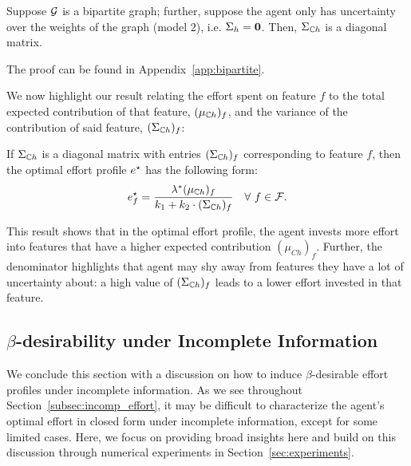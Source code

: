 \begin{prop}\label{prop:bipartite}
Suppose $\mathcal{G}$ is a bipartite graph; further, suppose the agent only has uncertainty over the weights of the graph (model $2$), i.e. $\Sigma_h = \bf{0}$. Then, $\Sigma_{\mathbb{C} h}$ is a diagonal matrix.
\end{prop}


The proof can be found in Appendix~\ref{app:bipartite}.


We now highlight our result relating the effort spent on feature $f$ to the total expected contribution of that feature, $(\mu_{\mathbb{C} h})_f$, and the variance of the contribution of said feature, $(\Sigma_{\mathbb{C} h})_f$:

\begin{cor}\label{cor:prop_effort}
If $\Sigma_{\mathbb{C} h}$ is a diagonal matrix with entries $(\Sigma_{\mathbb{C} h})_f$ corresponding to feature $f$, then the optimal effort profile $e^{\star}$ has the following form: 
\[
          e^{\star}_f =  \frac{\lambda^*(\mu_{\mathbb{C} h})_f}{k_1 + k_2 \cdot (\Sigma_{\mathbb{C} h})_f} \quad \forall~f \in \mathcal{F}.
\]
\end{cor}

\noindent 
This result shows that in the optimal effort profile, the agent invests more effort into features that have a higher expected contribution $(\mu_{Ch})_f$. Further, the denominator highlights that agent may shy away from features they have a lot of uncertainty about: a high value of $(\Sigma_{\mathbb{C} h})_f$ leads to a lower effort invested in that feature. 

\subsection{$\beta$-desirability under Incomplete Information} 
We conclude this section with a discussion on how to induce $\beta$-desirable effort profiles under incomplete information. As we see throughout Section~\ref{subsec:incomp_effort}, it may be difficult to characterize the agent's optimal effort in closed form under incomplete information, except for some limited cases. Here, we focus on providing broad insights here and build on this discussion through numerical experiments in Section~\ref{sec:experiments}.  

